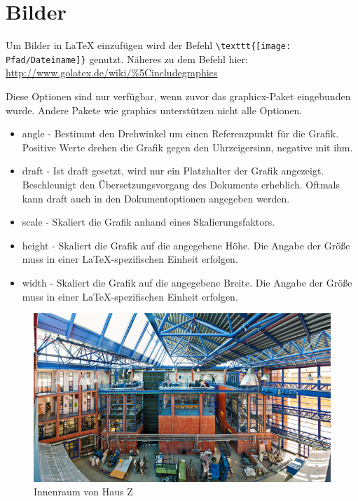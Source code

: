 \chapter{Bilder}

Um Bilder in \LaTeX{} einzufügen wird der Befehl \verb|\texttt{[image: Pfad/Dateiname]}| genutzt. Näheres zu dem Befehl hier: \url{http://www.golatex.de/wiki/%5Cincludegraphics}

Diese Optionen sind nur verfügbar, wenn zuvor das graphicx-Paket eingebunden wurde. Andere Pakete wie graphics unterstützen nicht alle Optionen.	
\begin{itemize}
\item angle - Bestimmt den Drehwinkel um einen Referenzpunkt für die Grafik. Positive Werte drehen die Grafik gegen den Uhrzeigersinn, negative mit ihm.
\item draft - Ist draft gesetzt, wird nur ein Platzhalter der Grafik angezeigt. Beschleunigt den Übersetzungsvorgang des Dokuments erheblich. Oftmals kann draft auch in den Dokumentoptionen angegeben werden.
\item scale - Skaliert die Grafik anhand eines Skalierungsfaktors.
\item height - Skaliert die Grafik auf die angegebene Höhe. Die Angabe der Größe muss in einer LaTeX-spezifischen Einheit erfolgen.
\item width - Skaliert die Grafik auf die angegebene Breite. Die Angabe der Größe muss in einer LaTeX-spezifischen Einheit erfolgen.
\end{itemize}	

\begin{figure}[ht]
	\centering
	\includegraphics{images/Haus_Z.jpeg}
	\caption{Innenraum von Haus Z \cite{hauszpic}}
	\label{fig1}
\end{figure}

